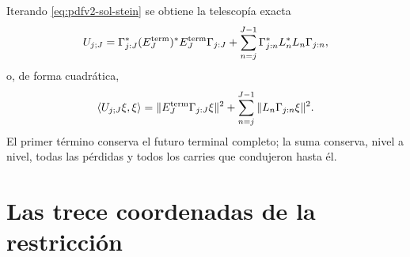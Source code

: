 Iterando \eqref{eq:pdfv2-sol-stein} se obtiene la telescopía exacta
\begin{equation}\label{eq:pdfv2-sol-telescopia-operatorial}
 U_{j;J}
 =\Gamma_{j:J}^*(E_J^{\rm term})^*E_J^{\rm term}\Gamma_{j:J}
  +\sum_{n=j}^{J-1}
   \Gamma_{j:n}^*L_n^*L_n\Gamma_{j:n},
\end{equation}
o, de forma cuadrática,
\begin{equation}\label{eq:pdfv2-sol-telescopia-normas}
 \langle U_{j;J}\xi,\xi\rangle
 =\|E_J^{\rm term}\Gamma_{j:J}\xi\|^2
  +\sum_{n=j}^{J-1}\|L_n\Gamma_{j:n}\xi\|^2.
\end{equation}
El primer término conserva el futuro terminal completo; la suma conserva,
nivel a nivel, todas las pérdidas y todos los carries que condujeron hasta él.

\iffalse
\section{Las trece coordenadas de la restricción}
\label{sec:pdfv2-sol-trece}

